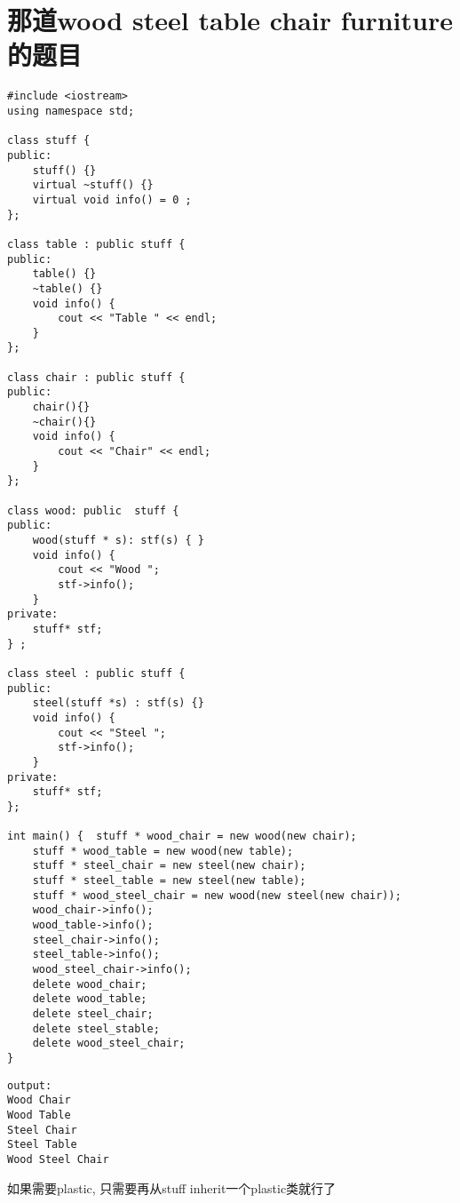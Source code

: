 \documentclass[12pt]{book}
\begin{document}
\section{那道wood steel table chair furniture的题目}
\label{sec-18-1}
\lstset{language=java,label= ,caption= ,numbers=none}
\begin{lstlisting}
#include <iostream>
using namespace std;

class stuff {
public:
    stuff() {}
    virtual ~stuff() {}
    virtual void info() = 0 ;
};

class table : public stuff {
public:
    table() {}
    ~table() {}
    void info() {
        cout << "Table " << endl;
    }
};

class chair : public stuff {
public:
    chair(){}
    ~chair(){}
    void info() {
        cout << "Chair" << endl;
    }
};

class wood: public  stuff {
public:
    wood(stuff * s): stf(s) { }
    void info() {
        cout << "Wood ";
        stf->info();
    }
private:
    stuff* stf;
} ;

class steel : public stuff {
public:
    steel(stuff *s) : stf(s) {}
    void info() {
        cout << "Steel ";
        stf->info();
    }
private:
    stuff* stf;
};

int main() {  stuff * wood_chair = new wood(new chair); 
    stuff * wood_table = new wood(new table); 
    stuff * steel_chair = new steel(new chair); 
    stuff * steel_table = new steel(new table); 
    stuff * wood_steel_chair = new wood(new steel(new chair)); 
    wood_chair->info(); 
    wood_table->info(); 
    steel_chair->info(); 
    steel_table->info(); 
    wood_steel_chair->info(); 
    delete wood_chair; 
    delete wood_table; 
    delete steel_chair; 
    delete steel_stable; 
    delete wood_steel_chair; 
}
\end{lstlisting}

\lstset{language=java,label= ,caption= ,numbers=none}
\begin{lstlisting}
output:
Wood Chair
Wood Table 
Steel Chair
Steel Table 
Wood Steel Chair
\end{lstlisting}

如果需要plastic, 只需要再从stuff inherit一个plastic类就行了
\end{document}
